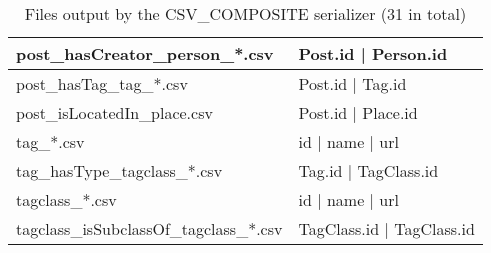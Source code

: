 \begin{table}[htb]
\begin{tabular}{|p{4.6cm}|p{11.4cm}|}
    	post\_hasCreator\_person\_*.csv          & Post.id | Person.id                                                                                         \\ \hline
    	post\_hasTag\_tag\_*.csv                 & Post.id | Tag.id                                                                                            \\ \hline
    	post\_isLocatedIn\_place.csv             & Post.id | Place.id                                                                                          \\ \hline
    	tag\_*.csv                               & id | name | url                                                                                             \\ \hline
    	tag\_hasType\_tagclass\_*.csv            & Tag.id | TagClass.id                                                                                        \\ \hline
    	tagclass\_*.csv                          & id | name | url                                                                                             \\ \hline
    	tagclass\_isSubclassOf\_tagclass\_*.csv  & TagClass.id | TagClass.id                                                                                   \\ \hline
    \end{tabular}
    \caption{Files output by the CSV\_COMPOSITE serializer (31 in total)}
    \label{table:csv}
\end{table}
